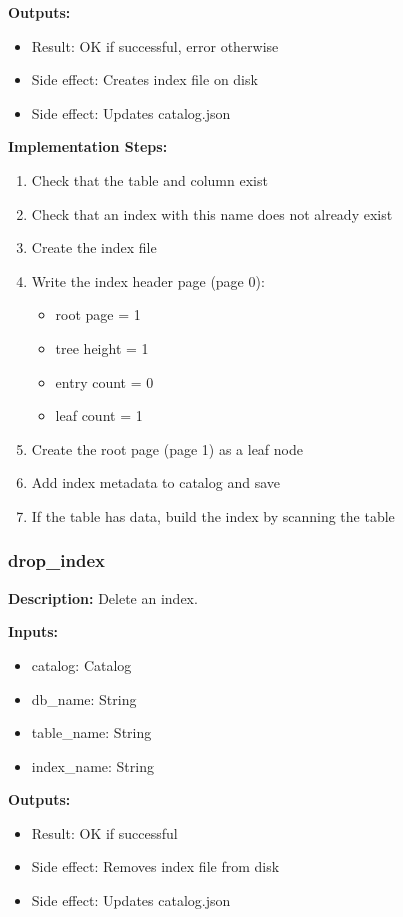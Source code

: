 \documentclass[11pt,a4paper]{article}
\begin{document}
\textbf{Outputs:}
\begin{itemize}
\item Result: OK if successful, error otherwise
\item Side effect: Creates index file on disk
\item Side effect: Updates catalog.json
\end{itemize}

\textbf{Implementation Steps:}
\begin{enumerate}
\item Check that the table and column exist
\item Check that an index with this name does not already exist
\item Create the index file
\item Write the index header page (page 0):
    \begin{itemize}
    \item root page = 1
    \item tree height = 1
    \item entry count = 0
    \item leaf count = 1
    \end{itemize}
\item Create the root page (page 1) as a leaf node
\item Add index metadata to catalog and save
\item If the table has data, build the index by scanning the table
\end{enumerate}

\subsubsection{drop\_index}

\textbf{Description:} Delete an index.

\textbf{Inputs:}
\begin{itemize}
\item catalog: Catalog
\item db\_name: String
\item table\_name: String
\item index\_name: String
\end{itemize}

\textbf{Outputs:}
\begin{itemize}
\item Result: OK if successful
\item Side effect: Removes index file from disk
\item Side effect: Updates catalog.json
\end{itemize}
\end{document}
